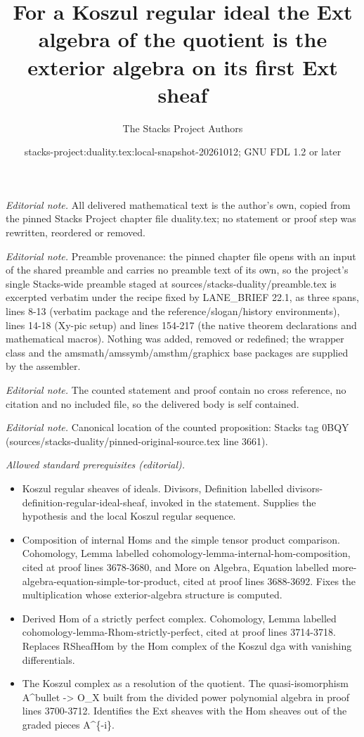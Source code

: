 \documentclass[10pt,a4paper]{amsart}
\title{For a Koszul regular ideal the Ext algebra of the quotient is the exterior algebra on its first Ext sheaf}
\author{The Stacks Project Authors}
\date{stacks-project:duality.tex:local-snapshot-20261012; GNU FDL 1.2 or later}
\theoremstyle{plain}
\theoremstyle{definition}
\theoremstyle{remark}
\numberwithin{equation}{subsection}
\begin{document}
\maketitle
\noindent\textit{Editorial note.} All delivered mathematical text is the author's own, copied from the pinned Stacks Project chapter file duality.tex; no statement or proof step was rewritten, reordered or removed.\par\medskip
\noindent\textit{Editorial note.} Preamble provenance: the pinned chapter file opens with an input of the shared preamble and carries no preamble text of its own, so the project's single Stacks-wide preamble staged at sources/stacks-duality/preamble.tex is excerpted verbatim under the recipe fixed by LANE\_BRIEF 22.1, as three spans, lines 8-13 (verbatim package and the reference/slogan/history environments), lines 14-18 (Xy-pic setup) and lines 154-217 (the native theorem declarations and mathematical macros). Nothing was added, removed or redefined; the wrapper class and the amsmath/amssymb/amsthm/graphicx base packages are supplied by the assembler.\par\medskip
\noindent\textit{Editorial note.} The counted statement and proof contain no cross reference, no citation and no included file, so the delivered body is self contained.\par\medskip
\noindent\textit{Editorial note.} Canonical location of the counted proposition: Stacks tag 0BQY (sources/stacks-duality/pinned-original-source.tex line 3661).\par\medskip
\noindent\textit{Allowed standard prerequisites (editorial).}\begin{itemize}
\item Koszul regular sheaves of ideals. Divisors, Definition labelled divisors-definition-regular-ideal-sheaf, invoked in the statement. Supplies the hypothesis and the local Koszul regular sequence.
\item Composition of internal Homs and the simple tensor product comparison. Cohomology, Lemma labelled cohomology-lemma-internal-hom-composition, cited at proof lines 3678-3680, and More on Algebra, Equation labelled more-algebra-equation-simple-tor-product, cited at proof lines 3688-3692. Fixes the multiplication whose exterior-algebra structure is computed.
\item Derived Hom of a strictly perfect complex. Cohomology, Lemma labelled cohomology-lemma-Rhom-strictly-perfect, cited at proof lines 3714-3718. Replaces RSheafHom by the Hom complex of the Koszul dga with vanishing differentials.
\item The Koszul complex as a resolution of the quotient. The quasi-isomorphism A\textasciicircum{}bullet -> O\_X built from the divided power polynomial algebra in proof lines 3700-3712. Identifies the Ext sheaves with the Hom sheaves out of the graded pieces A\textasciicircum{}\{-i\}.
\end{itemize}\medskip
\end{document}
